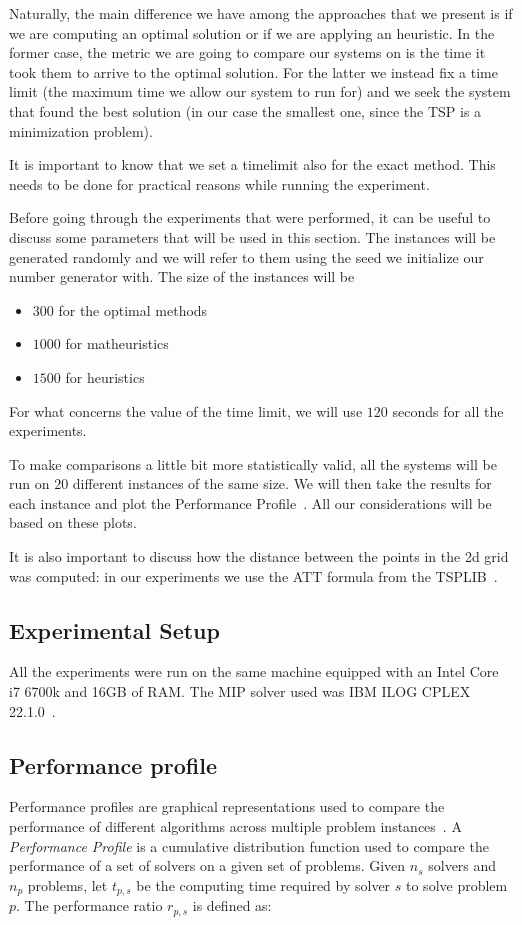\documentclass{article}
\begin{document}
Naturally, the main difference we have among the approaches that we present is if we are computing
an optimal solution or if we are applying an heuristic. In the former case, the metric we are going
to compare our systems on is the time it took them to arrive to the optimal solution.
For the latter we instead fix a time limit (the maximum time we allow our system to run for) and
we seek the system that found the best solution (in our case the smallest one, since the TSP
is a minimization problem).

It is important to know that we set a timelimit also for the exact method. This
needs to be done for practical reasons while running the experiment.

Before going through the experiments that were performed, it can be useful to discuss some
parameters that will be used in this section.
The instances will be generated randomly and we will refer to them using the seed we
initialize our number generator with.
The size of the instances will be
\begin{itemize}
        \item $300$ for the optimal methods
        \item $1000$ for matheuristics
        \item $1500$ for heuristics
\end{itemize}

For what concerns the value of the time limit, we will use $120$ seconds for all the
experiments.

To make comparisons a little bit more statistically valid, all the systems will be run on
$20$ different instances of the same size. We will then take the results for each instance
and plot the Performance Profile~\cite{dolan2002benchmarking}. All our considerations will be based on these plots.

It is also important to discuss how the distance between the points in the 2d
grid was computed: in our experiments we use the ATT formula from the TSPLIB~\cite{reinelt1991tsplib}.

\subsection{Experimental Setup}
All the experiments were run on the same machine equipped with an Intel Core i7 6700k
and 16GB of RAM. The MIP solver used was IBM ILOG CPLEX 22.1.0~\cite{cplex-docs}.

\subsection{Performance profile}
Performance profiles are graphical representations used to compare the performance of different algorithms
across multiple problem instances~\cite{dolan2002benchmarking}.
A \emph{Performance Profile} is a cumulative distribution function used to compare the performance of a set of solvers on a given set of problems. Given \( n_s \) solvers and \( n_p \) problems, let \( t_{p,s} \) be the computing time required by solver \( s \) to solve problem \( p \). The performance ratio \( r_{p,s} \) is defined as:
\end{document}
